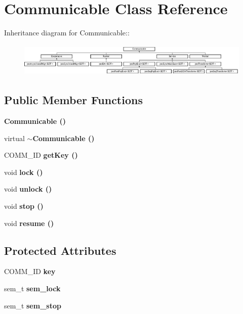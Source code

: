 \section{Communicable Class Reference}
\label{class_communicable}
Inheritance diagram for Communicable::\begin{figure}[H]
\begin{center}
\leavevmode
\includegraphics[height=1.6cm]{class_communicable}
\end{center}
\end{figure}
\subsection*{Public Member Functions}
\begin{CompactItemize}
\item 
\bf{Communicable} ()\label{class_communicable_8ae1827ecf7569b3db1ed386c7d8ad78}

\item 
virtual \bf{$\sim$Communicable} ()\label{class_communicable_2280b0dfa0d3a515fccf62c2a9fd5f41}

\item 
COMM\_\-ID \bf{get\-Key} ()\label{class_communicable_db4307b69b9ccacff55fdbf84b8f50e4}

\item 
void \bf{lock} ()\label{class_communicable_e1f8bd1ee810fd73d44315c95998d19d}

\item 
void \bf{unlock} ()\label{class_communicable_caa814847192e71f434fbf9479ede862}

\item 
void \bf{stop} ()\label{class_communicable_cb53e6534b947bc889aa181d9dbbd13b}

\item 
void \bf{resume} ()\label{class_communicable_3306a9adb11a0ab5af342c0db9f7bb2a}

\end{CompactItemize}
\subsection*{Protected Attributes}
\begin{CompactItemize}
\item 
COMM\_\-ID \bf{key}\label{class_communicable_605b0efeffe81326f216c9903f5bbf4c}

\item 
sem\_\-t \bf{sem\_\-lock}\label{class_communicable_cf9639312f71a2f348bc1e7789ccbd9d}

\item 
sem\_\-t \bf{sem\_\-stop}\label{class_communicable_29c53b9191348e0505e3bcba6d8b82b1}

\end{CompactItemize}
